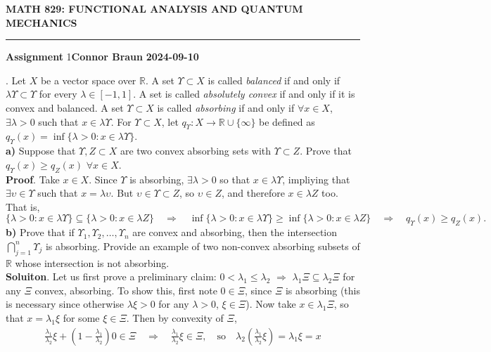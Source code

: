 \documentclass[10pt]{article}
\newcommand{\mbb}[1]{\mathbb{#1}}
\newcommand{\1}[1]{\mathbbm{1}_{#1}}
\begin{document}
    \begin{center}
        {\bf\large{MATH 829: FUNCTIONAL ANALYSIS AND QUANTUM MECHANICS}}
        \smallskip
        \hrule
        \smallskip
        {\bf Assignment} 1\hfill {\bf Connor Braun} \hfill {\bf 2024-09-10}
    \end{center}
    \vspace{5pt}
    . Let $X$ be a vector space over $\mbb{R}$. A set
    $\Upsilon\subset X$ is called {\it balanced} if and only if
    $\lambda\Upsilon\subset\Upsilon$ for every $\lambda\in[-1,1]$. A set is
    called {\it absolutely convex} if and only if it is convex and balanced. A
    set $\Upsilon \subset X$ is called {\it absorbing} if and only if $\forall
    x\in X$, $\exists \lambda >0$ such that $x\in\lambda\Upsilon$. For $\Upsilon
    \subset X$, let $q_\Upsilon:X\rightarrow \mbb{R}\cup\{\infty\}$ be defined
    as $q_\Upsilon(x)=\inf\{\lambda>0:x\in\lambda\Upsilon\}$. \\[5pt]
    {\bf a)} Suppose that $\Upsilon, Z\subset X$ are two convex absorbing sets
    with $\Upsilon\subset Z$. Prove that $q_\Upsilon(x)\geq q_Z(x)$ $\forall
    x\in X$.\\[5pt]
    {\bf Proof}. Take $x\in X$. Since $\Upsilon$ is absorbing,
    $\exists\lambda>0$ so that $x\in\lambda\Upsilon$, impliying that
    $\exists\upsilon\in\Upsilon$ such that $x=\lambda\upsilon$. But
    $\upsilon\in\Upsilon\subset Z$, so $\upsilon\in Z$, and therefore
    $x\in\lambda Z$ too. That is,
    \[\{\lambda>0:x\in\lambda\Upsilon\}\subseteq\{\lambda>0:x\in\lambda
    Z\}\quad\Rightarrow\quad\inf\{\lambda>0:x\in\lambda\Upsilon\}\geq
    \inf\{\lambda>0:x\in\lambda Z\}\quad\Rightarrow\quad q_\Upsilon(x)\geq
    q_Z(x).\tag*{$\qed$}\] {\bf b)} Prove that if
    $\Upsilon_1,\Upsilon_2,\dots,\Upsilon_n$ are convex and absorbing, then the
    intersection $\bigcap_{j=1}^n\Upsilon_j$ is absorbing. Provide an example of
    two non-convex absorbing subsets of $\mbb{R}$ whose intersection is not
    absorbing.\\[5pt]
    {\bf Soluiton}. Let us first prove a preliminary claim: $0<\lambda_1\leq
    \lambda_2$ $\Rightarrow$ $\lambda_1\Xi\subseteq\lambda_2\Xi$ for any $\Xi$
    convex, absorbing. To show this, first note $0\in\Xi$, since $\Xi$ is
    absorbing (this is necessary since otherwise $\lambda\xi>0$ for any
    $\lambda>0$, $\xi\in\Xi$). Now take $x\in\lambda_1\Xi$, so that
    $x=\lambda_1\xi$ for some $\xi\in\Xi$. Then by convexity of $\Xi$, 
    \begin{align*}
        \frac{\lambda_1}{\lambda_2}\xi+(1-\frac{\lambda_1}{\lambda_2})0\in\Xi\quad\Rightarrow\quad\frac{\lambda_1}{\lambda_2}\xi\in\Xi,\quad\text{so}\quad\lambda_2(\frac{\lambda_1}{\lambda_2}\xi)=\lambda_1\xi=x
    \end{align*}
\end{document}
